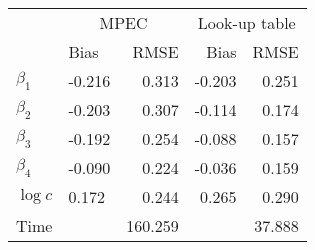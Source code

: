 
\begin{tabular}[t]{llrrr}
\toprule
\multicolumn{1}{c}{ } & \multicolumn{2}{c}{MPEC} & \multicolumn{2}{c}{Look-up table} \\
\cmidrule(l{3pt}r{3pt}){2-3} \cmidrule(l{3pt}r{3pt}){4-5}
  & Bias & RMSE & Bias & RMSE\\
\midrule
$\beta_{1}$ & -0.216 & 0.313 & -0.203 & 0.251\\
$\beta_{2}$ & -0.203 & 0.307 & -0.114 & 0.174\\
$\beta_{3}$ & -0.192 & 0.254 & -0.088 & 0.157\\
$\beta_{4}$ & -0.090 & 0.224 & -0.036 & 0.159\\
$\log c$ & 0.172 & 0.244 & 0.265 & 0.290\\
Time &  & 160.259 &  & 37.888\\
\bottomrule
\end{tabular}
